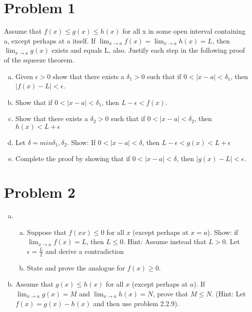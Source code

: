 \documentclass{article}
\newcommand\abs[1]{\left|#1\right|}
\begin{document}

\section*{Problem 1}
\begin{flushleft}
Assume that $f(x) \leq g(x) \leq h(x)$ for all x in some open interval containing a, except perhaps at a itself. If $\displaystyle \lim_{x \to a} f(x) = \lim_{x \to a} h(x) = L$, then $\lim_{x \to a} g(x)$ exists and equals L, also. Justify each step in the following proof of the squeeze theorem.
\begin{enumerate}[a)]
\item Given $\epsilon > 0$ show that there exists a $\delta_1 > 0$ such that if $0 < \abs{x-a} < \delta_1$, then $\abs{f(x) - L} < \epsilon$.
\item Show that if $0 < \abs{x-a} < \delta_1$, then $L - \epsilon < f(x)$.
\item Show that there exists a $\delta_2>0$ such that if $0 < \abs{x-a} < \delta_2$, then $h(x) < L + \epsilon$
\item Let $\delta=min{\delta_1, \delta_2}$. Show: If $0 <  \abs{x-a} < \delta$, then $L-\epsilon< g(x) < L+\epsilon$
\item Complete the proof by showing that if $0<\abs{x-a}<\delta$, then $\abs{g(x)-L} < \epsilon$.
\end{enumerate}

\newpage

\section*{Problem 2}
\begin{enumerate}[a)]
\item \begin{enumerate}[a)] \item Suppose that $f(xx) \leq 0$ for all $x$ (except perhaps at $x=a$). Show: if $\displaystyle \lim_{x \to a} f(x)=L$, then $L\leq0$. Hint: Assume instead that $L > 0$. Let $\epsilon=\frac{L}{2}$ and derive a contradiction \item State and prove the analogue for $f(x) \geq 0$. \end{enumerate}
\item Assume that $g(x) \leq h(x)$ for all $x$ (except perhaps at $a$). If $\displaystyle \lim_{x \to a} g(x)=M$
and $\displaystyle \lim_{x \to a} h(x) = N$, prove that $M \leq N$. (Hint: Let $f(x) = g(x) - h(x)$ and then use problem 2.2.9). \end{enumerate}


\end{flushleft}
\end{document}
